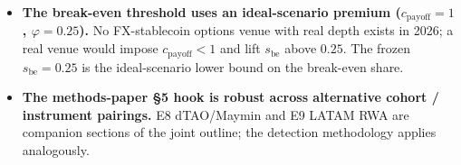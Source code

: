 \documentclass[11pt,letterpaper]{article}
\newcommand{\sbe}{s_{\mathrm{be}}}
\theoremstyle{assumption}
\begin{document}
\begin{itemize}
\item \textbf{The break-even threshold uses an ideal-scenario premium
  ($c_{\mathrm{payoff}} = 1$, $\varphi = 0.25$).} No FX-stablecoin
  options venue with real depth exists in 2026; a real venue would impose
  $c_{\mathrm{payoff}} < 1$ and lift $\sbe$ above $0.25$. The frozen
  $\sbe = 0.25$ is the ideal-scenario lower bound on the break-even share.

\item \textbf{The methods-paper §5 hook is robust across alternative
  cohort / instrument pairings.} E8 dTAO/Maymin and E9 LATAM RWA are
  companion sections of the joint outline; the detection methodology
  applies analogously.
\end{itemize}

\end{document}
